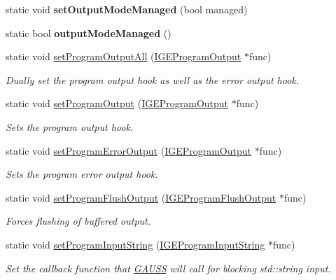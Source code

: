 \begin{DoxyCompactItemize}
\item 
\hypertarget{class_g_a_u_s_s_aae02638c0ed07f118b97a2e500ebf369}{static void {\bfseries set\-Output\-Mode\-Managed} (bool managed)}\label{class_g_a_u_s_s_aae02638c0ed07f118b97a2e500ebf369}

\item 
\hypertarget{class_g_a_u_s_s_a03e56984916b9dedde2811291b81b466}{static bool {\bfseries output\-Mode\-Managed} ()}\label{class_g_a_u_s_s_a03e56984916b9dedde2811291b81b466}

\item 
static void \hyperlink{class_g_a_u_s_s_a0b8379c48d677e05aeab433dba66fbb6}{set\-Program\-Output\-All} (\hyperlink{class_i_g_e_program_output}{I\-G\-E\-Program\-Output} $\ast$func)
\begin{DoxyCompactList}\small\item\em Dually set the program output hook as well as the error output hook. \end{DoxyCompactList}\item 
static void \hyperlink{class_g_a_u_s_s_a7f0dc6b5b307aa06c347f9c6a9fdacab}{set\-Program\-Output} (\hyperlink{class_i_g_e_program_output}{I\-G\-E\-Program\-Output} $\ast$func)
\begin{DoxyCompactList}\small\item\em Sets the program output hook. \end{DoxyCompactList}\item 
static void \hyperlink{class_g_a_u_s_s_abd75266b2c4075da75163fe95b013ef3}{set\-Program\-Error\-Output} (\hyperlink{class_i_g_e_program_output}{I\-G\-E\-Program\-Output} $\ast$func)
\begin{DoxyCompactList}\small\item\em Sets the program error output hook. \end{DoxyCompactList}\item 
static void \hyperlink{class_g_a_u_s_s_a4b7ecb768f49b98110729db7e5728296}{set\-Program\-Flush\-Output} (\hyperlink{class_i_g_e_program_flush_output}{I\-G\-E\-Program\-Flush\-Output} $\ast$func)
\begin{DoxyCompactList}\small\item\em Forces flushing of buffered output. \end{DoxyCompactList}\item 
static void \hyperlink{class_g_a_u_s_s_ae82b5bfdf26971433c46936a812506c3}{set\-Program\-Input\-String} (\hyperlink{class_i_g_e_program_input_string}{I\-G\-E\-Program\-Input\-String} $\ast$func)
\begin{DoxyCompactList}\small\item\em Set the callback function that \hyperlink{class_g_a_u_s_s}{G\-A\-U\-S\-S} will call for blocking std\-::string input. \end{DoxyCompactList}\item 

\end{DoxyCompactItemize}
